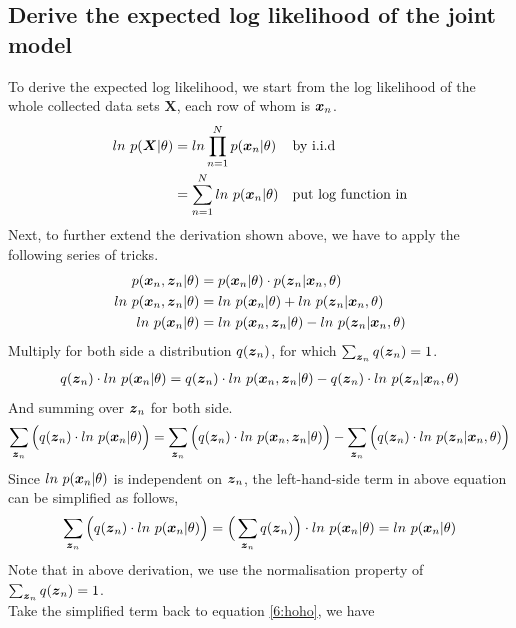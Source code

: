 \documentclass[11pt,a4paper]{article}
\newcommand{\htab}{\hspace*{0.63cm}}
\newcommand{\bs}[1]{\boldsymbol{#1}}
\begin{document}
\subsection{Derive the expected log likelihood of the joint model}
\htab To derive the expected log likelihood, we start from the log likelihood of the whole
collected data sets $\bs{X}$, each row of whom is $\xn$. 
\begin{align}
    ln\ p(\bs{X} | \theta) 
    &= ln \prodn p (\xn | \theta ) &&\mbox{by i.i.d} \\
    &= \sumn ln\ p (\xn | \theta) &&\mbox{put log function in} \label{6:likeinit}
    \end{align}
\htab Next, to further extend the derivation shown above, we have to apply the following series of tricks.
\begin{align}
    p (\xn, \zn | \theta) &= p (\xn | \theta) \cdot p(\zn | \xn, \theta) \\
    ln\ p (\xn, \zn | \theta) &= ln\ p (\xn | \theta) + ln\ p(\zn | \xn, \theta) \\
    ln\ p (\xn | \theta) &= ln\ p (\xn, \zn | \theta) - ln\ p(\zn | \xn, \theta) 
    \end{align}
\htab Multiply for both side a distribution $q(\zn)$, for which $\sumzn q(\zn) = 1$.
\begin{align}
    q(\zn) \cdot ln\ p (\xn | \theta) 
    = q(\zn) \cdot ln\ p (\xn, \zn | \theta) 
        - q(\zn) \cdot ln\ p(\zn | \xn, \theta) 
    \end{align}
\htab And summing over $\zn$ for both side.
\begin{align}
    \sumzn \Big( q(\zn) \cdot ln\ p (\xn | \theta) \Big)
    = \sumzn \Big( q(\zn) \cdot ln\ p (\xn, \zn | \theta) \Big) 
    - \sumzn \Big(  q(\zn) \cdot ln\ p(\zn | \xn, \theta) \Big)  \label{6:hoho}
    \end{align}
\htab Since $ln\ p (\xn | \theta)$ is independent on $\zn$, the left-hand-side term in above equation
can be simplified as follows,
\begin{align}
    \sumzn \Big( q(\zn) \cdot ln\ p (\xn | \theta) \Big)
    = \Big( \sumzn q(\zn)  \Big)  \cdot ln\ p (\xn | \theta) 
    = ln\ p (\xn | \theta)
    \end{align}
\htab Note that in above derivation, we use the normalisation property of $\sumzn q(\zn) = 1$. \\
\htab Take the simplified term back to equation \eqref{6:hoho}, we have
\end{document}
